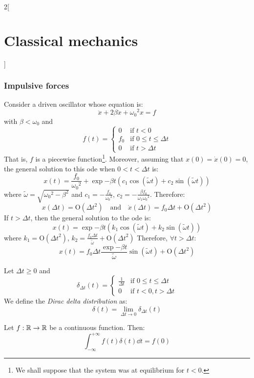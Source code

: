 \documentclass[../../../main_physics.tex]{subfiles}
\begin{document}
\begin{multicols}{2}[\section{Classical mechanics}]
  \subsubsection{Impulsive forces}
  \begin{proposition}
    Consider a driven oscillator whose equation is:
    \begin{equation}\label{CM_impulse}
      \ddot{x}+2\beta\dot{x}+{\omega_0}^2x=f
    \end{equation}
    with $\beta<\omega_0$ and $$f(t)=
      \begin{cases}
        0   & \text{if }t<0                  \\
        f_0 & \text{if }0\leq t\leq \Delta t \\
        0   & \text{if }t>\Delta t
      \end{cases}$$
    That is, $f$ is a piecewise function\footnote{We shall suppose that the system was at equilibrium for $t<0$.}. Moreover, assuming that $x(0)=\dot{x}(0)=0$, the general solution to this ode when $0<t<\Delta t$ is:
    $$x(t)=\frac{f_0}{{\omega_0}^2}+\exp{-\beta t}\left(c_1\cos(\tilde{\omega}t)+c_2\sin(\tilde{\omega}t)\right)$$
    where $\tilde{\omega}=\sqrt{{\omega_0}^2-\beta^2}$ and $c_1=-\frac{f_0}{{\omega_0}^2}$, $c_2=-\frac{\beta f_0}{\omega_1{\omega_0}^2}$.
    Therefore: $$x(\Delta t)=\text{O}({\Delta t}^2)\quad\text{and}\quad\dot{x}(\Delta t)=f_0\Delta t+\text{O}({\Delta t}^2)$$
    If $t>\Delta t$, then the general solution to the ode is:
    $$x(t)=\exp{-\beta t}\left(k_1\cos(\tilde{\omega}t)+k_2\sin(\tilde{\omega}t)\right)$$ where $k_1=\text{O}({\Delta t}^2)$, $k_2=\frac{f_0\Delta t}{\tilde{\omega}}+\text{O}({\Delta t}^2)$
    Therefore, $\forall t>\Delta t$: $$x(t)=f_0\Delta t\frac{\exp{-\beta t}}{\tilde{\omega}}\sin(\tilde{\omega}t)+\text{O}({\Delta t}^2)$$
  \end{proposition}
  \begin{definition}
    Let $\Delta t\geq 0$ and $$\delta_{\Delta t}(t)=
      \begin{cases}
        \frac{1}{\Delta t} & \text{if }0\leq t\leq \Delta t \\
        0                  & \text{if }t<0,t>\Delta t
      \end{cases}
    $$
    We define the \emph{Dirac delta distribution} as: $$\delta(t)=\lim_{\Delta t\to 0}\delta_{\Delta t}(t)$$
  \end{definition}
  \begin{proposition}
    Let $f:\mathbb{R}\rightarrow\mathbb{R}$ be a continuous function. Then: $$\int_{-\infty}^{+\infty}f(t)\delta(t)\dd{t}=f(0)$$

\end{proposition}
\end{multicols}
\end{document}
